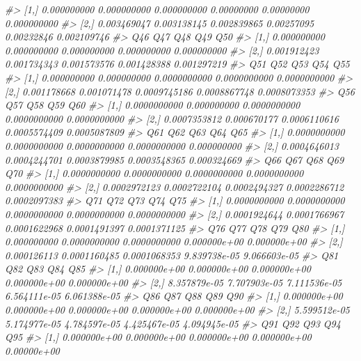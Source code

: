 \documentclass[]{article}
\newenvironment{Shaded}{\begin{snugshade}}{\end{snugshade}}
\newcommand{\CommentTok}[1]{\textcolor[rgb]{0.56,0.35,0.01}{\textit{#1}}}
\begin{document}
\begin{Shaded}
\begin{Highlighting}[]
\CommentTok{#> [1,] 0.000000000 0.000000000 0.000000000 0.00000000 0.00000000 0.000000000}
\CommentTok{#> [2,] 0.003469047 0.003138145 0.002839865 0.00257095 0.00232846 0.002109746}
\CommentTok{#>              Q46         Q47         Q48         Q49         Q50}
\CommentTok{#> [1,] 0.000000000 0.000000000 0.000000000 0.000000000 0.000000000}
\CommentTok{#> [2,] 0.001912423 0.001734343 0.001573576 0.001428388 0.001297219}
\CommentTok{#>              Q51         Q52          Q53          Q54          Q55}
\CommentTok{#> [1,] 0.000000000 0.000000000 0.0000000000 0.0000000000 0.0000000000}
\CommentTok{#> [2,] 0.001178668 0.001071478 0.0009745186 0.0008867748 0.0008073353}
\CommentTok{#>               Q56         Q57          Q58          Q59          Q60}
\CommentTok{#> [1,] 0.0000000000 0.000000000 0.0000000000 0.0000000000 0.0000000000}
\CommentTok{#> [2,] 0.0007353812 0.000670177 0.0006110616 0.0005574409 0.0005087809}
\CommentTok{#>               Q61          Q62          Q63          Q64         Q65}
\CommentTok{#> [1,] 0.0000000000 0.0000000000 0.0000000000 0.0000000000 0.000000000}
\CommentTok{#> [2,] 0.0004646013 0.0004244701 0.0003879985 0.0003548365 0.000324669}
\CommentTok{#>               Q66          Q67          Q68          Q69          Q70}
\CommentTok{#> [1,] 0.0000000000 0.0000000000 0.0000000000 0.0000000000 0.0000000000}
\CommentTok{#> [2,] 0.0002972123 0.0002722104 0.0002494327 0.0002286712 0.0002097383}
\CommentTok{#>               Q71          Q72          Q73          Q74          Q75}
\CommentTok{#> [1,] 0.0000000000 0.0000000000 0.0000000000 0.0000000000 0.0000000000}
\CommentTok{#> [2,] 0.0001924644 0.0001766967 0.0001622968 0.0001491397 0.0001371125}
\CommentTok{#>              Q76          Q77          Q78          Q79          Q80}
\CommentTok{#> [1,] 0.000000000 0.0000000000 0.0000000000 0.000000e+00 0.000000e+00}
\CommentTok{#> [2,] 0.000126113 0.0001160485 0.0001068353 9.839738e-05 9.066603e-05}
\CommentTok{#>               Q81          Q82          Q83          Q84          Q85}
\CommentTok{#> [1,] 0.000000e+00 0.000000e+00 0.000000e+00 0.000000e+00 0.000000e+00}
\CommentTok{#> [2,] 8.357879e-05 7.707903e-05 7.111536e-05 6.564111e-05 6.061388e-05}
\CommentTok{#>               Q86          Q87          Q88          Q89          Q90}
\CommentTok{#> [1,] 0.000000e+00 0.000000e+00 0.000000e+00 0.000000e+00 0.000000e+00}
\CommentTok{#> [2,] 5.599512e-05 5.174977e-05 4.784597e-05 4.425467e-05 4.094945e-05}
\CommentTok{#>               Q91          Q92          Q93          Q94         Q95}
\CommentTok{#> [1,] 0.000000e+00 0.000000e+00 0.000000e+00 0.000000e+00 0.00000e+00}

\end{Highlighting}
\end{Shaded}
\end{document}
